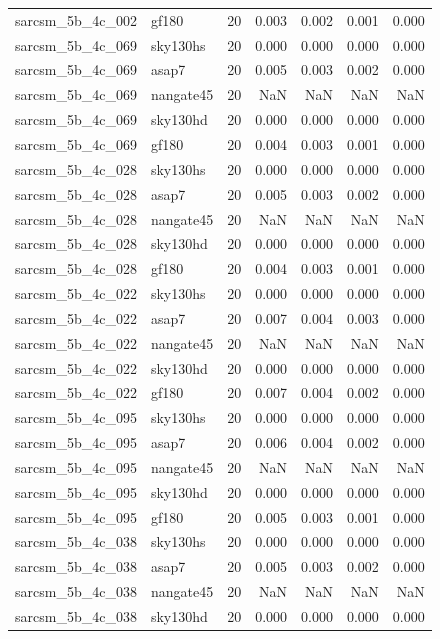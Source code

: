 \begin{tabular}{llrrrrr}
sarcsm\_5b\_4c\_002 & gf180 & 20 & 0.003 & 0.002 & 0.001 & 0.000 \\
sarcsm\_5b\_4c\_069 & sky130hs & 20 & 0.000 & 0.000 & 0.000 & 0.000 \\
sarcsm\_5b\_4c\_069 & asap7 & 20 & 0.005 & 0.003 & 0.002 & 0.000 \\
sarcsm\_5b\_4c\_069 & nangate45 & 20 & NaN & NaN & NaN & NaN \\
sarcsm\_5b\_4c\_069 & sky130hd & 20 & 0.000 & 0.000 & 0.000 & 0.000 \\
sarcsm\_5b\_4c\_069 & gf180 & 20 & 0.004 & 0.003 & 0.001 & 0.000 \\
sarcsm\_5b\_4c\_028 & sky130hs & 20 & 0.000 & 0.000 & 0.000 & 0.000 \\
sarcsm\_5b\_4c\_028 & asap7 & 20 & 0.005 & 0.003 & 0.002 & 0.000 \\
sarcsm\_5b\_4c\_028 & nangate45 & 20 & NaN & NaN & NaN & NaN \\
sarcsm\_5b\_4c\_028 & sky130hd & 20 & 0.000 & 0.000 & 0.000 & 0.000 \\
sarcsm\_5b\_4c\_028 & gf180 & 20 & 0.004 & 0.003 & 0.001 & 0.000 \\
sarcsm\_5b\_4c\_022 & sky130hs & 20 & 0.000 & 0.000 & 0.000 & 0.000 \\
sarcsm\_5b\_4c\_022 & asap7 & 20 & 0.007 & 0.004 & 0.003 & 0.000 \\
sarcsm\_5b\_4c\_022 & nangate45 & 20 & NaN & NaN & NaN & NaN \\
sarcsm\_5b\_4c\_022 & sky130hd & 20 & 0.000 & 0.000 & 0.000 & 0.000 \\
sarcsm\_5b\_4c\_022 & gf180 & 20 & 0.007 & 0.004 & 0.002 & 0.000 \\
sarcsm\_5b\_4c\_095 & sky130hs & 20 & 0.000 & 0.000 & 0.000 & 0.000 \\
sarcsm\_5b\_4c\_095 & asap7 & 20 & 0.006 & 0.004 & 0.002 & 0.000 \\
sarcsm\_5b\_4c\_095 & nangate45 & 20 & NaN & NaN & NaN & NaN \\
sarcsm\_5b\_4c\_095 & sky130hd & 20 & 0.000 & 0.000 & 0.000 & 0.000 \\
sarcsm\_5b\_4c\_095 & gf180 & 20 & 0.005 & 0.003 & 0.001 & 0.000 \\
sarcsm\_5b\_4c\_038 & sky130hs & 20 & 0.000 & 0.000 & 0.000 & 0.000 \\
sarcsm\_5b\_4c\_038 & asap7 & 20 & 0.005 & 0.003 & 0.002 & 0.000 \\
sarcsm\_5b\_4c\_038 & nangate45 & 20 & NaN & NaN & NaN & NaN \\
sarcsm\_5b\_4c\_038 & sky130hd & 20 & 0.000 & 0.000 & 0.000 & 0.000 \\

\end{tabular}
